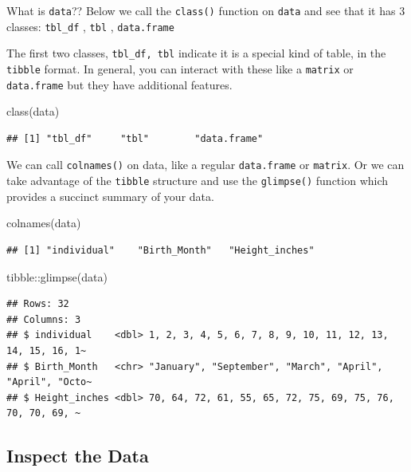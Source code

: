 \documentclass[
]{book}
\newenvironment{Shaded}{\begin{snugshade}}{\end{snugshade}}
\newcommand{\FunctionTok}[1]{\textcolor[rgb]{0.00,0.00,0.00}{#1}}
\newcommand{\NormalTok}[1]{#1}
\newcommand{\SpecialCharTok}[1]{\textcolor[rgb]{0.00,0.00,0.00}{#1}}
\begin{document}
What is \texttt{data}?? Below we call the \texttt{class()} function on \texttt{data} and see that it has 3 classes:
\texttt{tbl\_df} , \texttt{tbl} , \texttt{data.frame}

The first two classes, \texttt{tbl\_df,\ tbl} indicate it is a special kind of table, in the \texttt{tibble} format. In general, you can interact with these like a \texttt{matrix} or \texttt{data.frame} but they have additional features.

\begin{Shaded}
\begin{Highlighting}[]
\FunctionTok{class}\NormalTok{(data)}
\end{Highlighting}
\end{Shaded}

\begin{verbatim}
## [1] "tbl_df"     "tbl"        "data.frame"
\end{verbatim}

We can call \texttt{colnames()} on data, like a regular \texttt{data.frame} or \texttt{matrix}. Or we can take advantage of the \texttt{tibble} structure and use the \texttt{glimpse()} function which provides a succinct summary of your data.

\begin{Shaded}
\begin{Highlighting}[]
\FunctionTok{colnames}\NormalTok{(data)}
\end{Highlighting}
\end{Shaded}

\begin{verbatim}
## [1] "individual"    "Birth_Month"   "Height_inches"
\end{verbatim}

\begin{Shaded}
\begin{Highlighting}[]
\NormalTok{tibble}\SpecialCharTok{::}\FunctionTok{glimpse}\NormalTok{(data)}
\end{Highlighting}
\end{Shaded}

\begin{verbatim}
## Rows: 32
## Columns: 3
## $ individual    <dbl> 1, 2, 3, 4, 5, 6, 7, 8, 9, 10, 11, 12, 13, 14, 15, 16, 1~
## $ Birth_Month   <chr> "January", "September", "March", "April", "April", "Octo~
## $ Height_inches <dbl> 70, 64, 72, 61, 55, 65, 72, 75, 69, 75, 76, 70, 70, 69, ~
\end{verbatim}

\hypertarget{inspect-the-data}{%
\subsection{Inspect the Data}\label{inspect-the-data}}
\end{document}
